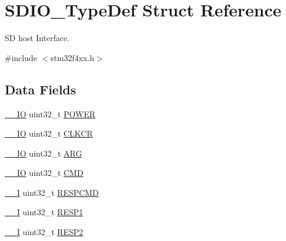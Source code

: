 \hypertarget{struct_s_d_i_o___type_def}{\section{S\-D\-I\-O\-\_\-\-Type\-Def Struct Reference}
\label{struct_s_d_i_o___type_def}
}


S\-D host Interface.  




{\ttfamily \#include $<$stm32f4xx.\-h$>$}

\subsection*{Data Fields}
\begin{DoxyCompactItemize}
\item 
\hyperlink{group___c_m_s_i_s__core__definitions_gaec43007d9998a0a0e01faede4133d6be}{\-\_\-\-\_\-\-I\-O} uint32\-\_\-t \hyperlink{struct_s_d_i_o___type_def_a65bff76f3af24c37708a1006d54720c7}{P\-O\-W\-E\-R}
\item 
\hyperlink{group___c_m_s_i_s__core__definitions_gaec43007d9998a0a0e01faede4133d6be}{\-\_\-\-\_\-\-I\-O} uint32\-\_\-t \hyperlink{struct_s_d_i_o___type_def_aa94197378e20fc739d269be49d9c5d40}{C\-L\-K\-C\-R}
\item 
\hyperlink{group___c_m_s_i_s__core__definitions_gaec43007d9998a0a0e01faede4133d6be}{\-\_\-\-\_\-\-I\-O} uint32\-\_\-t \hyperlink{struct_s_d_i_o___type_def_a07d4e63efcbde252c667e64a8d818aa9}{A\-R\-G}
\item 
\hyperlink{group___c_m_s_i_s__core__definitions_gaec43007d9998a0a0e01faede4133d6be}{\-\_\-\-\_\-\-I\-O} uint32\-\_\-t \hyperlink{struct_s_d_i_o___type_def_adcf812cbe5147d300507d59d4a55935d}{C\-M\-D}
\item 
\hyperlink{group___c_m_s_i_s__core__definitions_gaf63697ed9952cc71e1225efe205f6cd3}{\-\_\-\-\_\-\-I} uint32\-\_\-t \hyperlink{struct_s_d_i_o___type_def_aad371db807e2db4a2edf05b3f2f4b6cd}{R\-E\-S\-P\-C\-M\-D}
\item 
\hyperlink{group___c_m_s_i_s__core__definitions_gaf63697ed9952cc71e1225efe205f6cd3}{\-\_\-\-\_\-\-I} uint32\-\_\-t \hyperlink{struct_s_d_i_o___type_def_a7b0ee0dc541683266dfab6335abca891}{R\-E\-S\-P1}
\item 
\hyperlink{group___c_m_s_i_s__core__definitions_gaf63697ed9952cc71e1225efe205f6cd3}{\-\_\-\-\_\-\-I} uint32\-\_\-t \hyperlink{struct_s_d_i_o___type_def_a4d99c78dffdb6e81e8f6b7abec263419}{R\-E\-S\-P2}
\item 

\end{DoxyCompactItemize}
